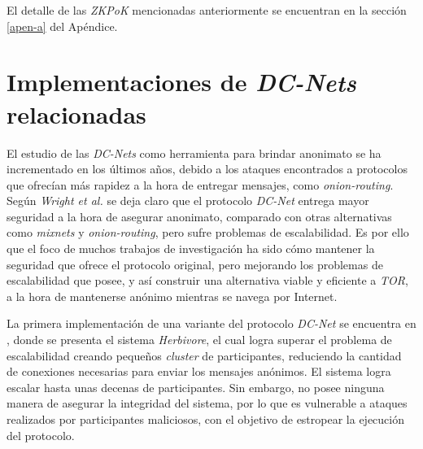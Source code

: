 El detalle de las \emph{ZKPoK} mencionadas anteriormente se encuentran en la 
sección \ref{apen-a} del Apéndice.

\section{Implementaciones de \emph{DC-Nets} relacionadas}

El estudio de las \emph{DC-Nets} como herramienta para brindar anonimato se ha 
incrementado en los últimos años, debido a los ataques 
encontrados a protocolos que ofrecían más rapidez a la hora de entregar 
mensajes, como \emph{onion-routing}. Según \emph{Wright et al.} 
\cite{wright2002analysis} se deja claro que el protocolo \emph{DC-Net} entrega 
mayor seguridad a la hora de asegurar anonimato, comparado con otras 
alternativas como \emph{mixnets} y \emph{onion-routing}, 
pero sufre problemas de escalabilidad. Es por ello que el foco de muchos 
trabajos de investigación ha sido cómo mantener la 
seguridad que ofrece el protocolo original, pero mejorando los problemas de 
escalabilidad que posee, y así construir 
una alternativa viable y eficiente a \emph{TOR}, a la hora de mantenerse 
anónimo mientras se navega por Internet.

La primera implementación de una variante del protocolo \emph{DC-Net} se 
encuentra en \cite{goel2003herbivore}, donde se presenta el 
sistema \emph{Herbivore}, el cual logra superar el problema de escalabilidad 
creando pequeños \emph{cluster} de participantes, 
reduciendo la cantidad de conexiones necesarias para enviar los mensajes 
anónimos. El sistema logra escalar hasta unas decenas 
de participantes. Sin embargo, no posee ninguna manera de asegurar la 
integridad del sistema, por lo que es vulnerable a 
ataques realizados por participantes maliciosos, con el objetivo de estropear 
la ejecución del protocolo.

